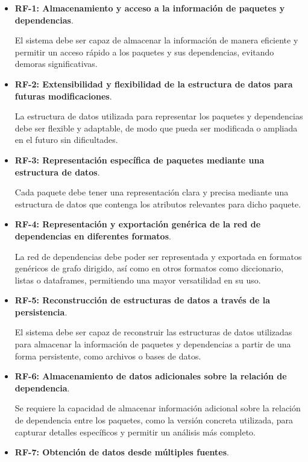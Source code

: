 \begin{itemize}
	\item \textbf{RF-1: Almacenamiento y acceso a la información de paquetes y dependencias}.

	      El sistema debe ser capaz de almacenar la información de manera eficiente y permitir un acceso rápido a los paquetes y sus dependencias, evitando demoras significativas.

	\item \textbf{RF-2: Extensibilidad y flexibilidad de la estructura de datos para futuras modificaciones}.

	      La estructura de datos utilizada para representar los paquetes y dependencias debe ser flexible y adaptable, de modo que pueda ser modificada o ampliada en el futuro sin dificultades.

	\item \textbf{RF-3: Representación específica de paquetes mediante una estructura de datos}.

	      Cada paquete debe tener una representación clara y precisa mediante una estructura de datos que contenga los atributos relevantes para dicho paquete.

	\item \textbf{RF-4: Representación y exportación genérica de la red de dependencias en diferentes formatos}.

	      La red de dependencias debe poder ser representada y exportada en formatos genéricos de grafo dirigido, así como en otros formatos como diccionario, listas o dataframes, permitiendo una mayor versatilidad en su uso.

	\item \textbf{RF-5: Reconstrucción de estructuras de datos a través de la persistencia}.

	      El sistema debe ser capaz de reconstruir las estructuras de datos utilizadas para almacenar la información de paquetes y dependencias a partir de una forma persistente, como archivos o bases de datos.

	\item \textbf{RF-6: Almacenamiento de datos adicionales sobre la relación de dependencia}.

	      Se requiere la capacidad de almacenar información adicional sobre la relación de dependencia entre los paquetes, como la versión concreta utilizada, para capturar detalles específicos y permitir un análisis más completo.

	\item \textbf{RF-7: Obtención de datos desde múltiples fuentes}.


\end{itemize}
